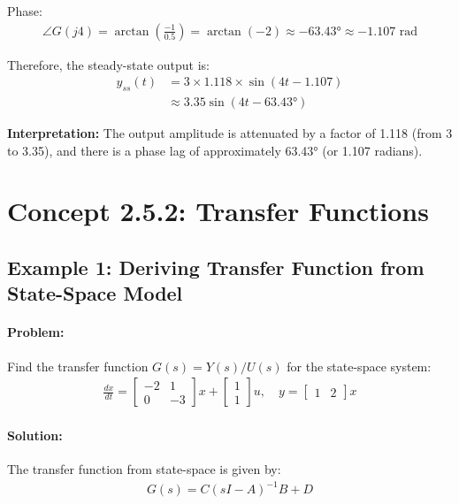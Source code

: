 \documentclass[11pt,a4paper]{article}
\begin{document}
Phase:
\begin{align}
\angle G(j4) = \arctan\left(\frac{-1}{0.5}\right) = \arctan(-2) \approx -63.43° \approx -1.107 \text{ rad}
\end{align}

Therefore, the steady-state output is:
\begin{align}
y_{ss}(t) &= 3 \times 1.118 \times \sin(4t - 1.107) \\
&\approx 3.35\sin(4t - 63.43°)
\end{align}

\textbf{Interpretation:} The output amplitude is attenuated by a factor of 1.118 (from 3 to 3.35), and there is a phase lag of approximately 63.43° (or 1.107 radians).

\section{Concept 2.5.2: Transfer Functions}

\subsection{Example 1: Deriving Transfer Function from State-Space Model}

\paragraph{Problem:} Find the transfer function $G(s) = Y(s)/U(s)$ for the state-space system:
\begin{align}
\frac{dx}{dt} = \begin{bmatrix} -2 & 1 \\ 0 & -3 \end{bmatrix}x + \begin{bmatrix} 1 \\ 1 \end{bmatrix}u, \quad y = \begin{bmatrix} 1 & 2 \end{bmatrix}x
\end{align}

\paragraph{Solution:}

The transfer function from state-space is given by:
\begin{align}
G(s) = C(sI - A)^{-1}B + D
\end{align}
\end{document}
